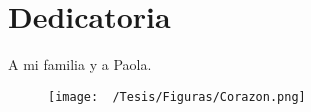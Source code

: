 \chapter*{Dedicatoria}
A mi familia y a Paola.
\begin{figure}[h]
  \begin{center}
	\texttt{[image: ~/Tesis/Figuras/Corazon.png]}
  \end{center}
\end{figure}
